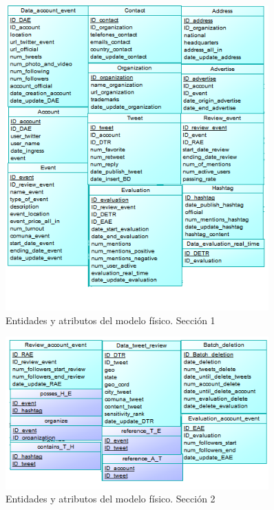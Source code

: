 \documentclass{memoria}
\begin{document}
\begin{figure}[!ht]
\begin{center}
\includegraphics[width=0.9\textwidth]{img/tablafisica2.png}
\caption{Entidades y atributos del modelo físico. Sección 1}
\end{center}
\end{figure}
\newpage
\begin{figure}[!ht]
\begin{center}
\includegraphics[width=0.9\textwidth]{img/tablafisica3.png}
\caption{Entidades y atributos del modelo físico. Sección 2}
\end{center}
\end{figure}
\end{document}

